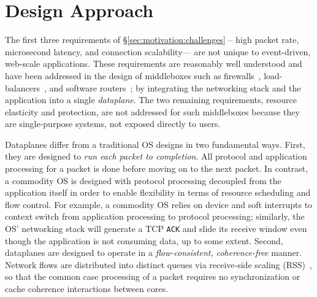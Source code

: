 \section{\ix Design Approach}
\label{sec:design}


The first three requirements of \S\ref{sec:motivation:challenges} --
high packet rate, microsecond latency, and connection scalability---
are not unique to event-driven, web-scale applications.  These
requirements are reasonably well understood and have been addressed in
the design of middleboxes such as firewalls~\cite{missing},
load-balancers~\cite{missing}, and software
routers~\cite{DBLP:journals/tocs/KohlerMCJK00,DBLP:conf/sosp/DobrescuEACFIKMR09};
by integrating the networking stack and the application into a single
\emph{dataplane}. The two remaining requirements, resource elasticity
and protection, are not addressed for such middleboxes because they
are single-purpose systems, not exposed directly to users. 


Dataplanes differ from a traditional OS designs in two fundamental
ways. First, they are designed to \emph{run each packet to
  completion}. All protocol and application processing for a packet is
done before moving on to the next packet.  In contrast, a commodity OS is designed
with protocol processing decoupled from the application itself in
order to enable flexibility in terms of resource scheduling and flow
control. For example, a commodity OS relies on device and soft interrupts to context switch from application processing to protocol processing; 
similarly, the OS' networking stack will generate a TCP \texttt{ACK} and
slide its receive window even though the application is not consuming
data, up to some extent. Second, dataplanes are designed to operate in
a \emph{flow-consistent, coherence-free} manner.
Network flows are distributed into distinct queues via receive-side
scaling (RSS)~\cite{DBLP:journals/computer/RegnierMIIMHNCF04}, so that 
the common case processing of a packet requires no synchronization or cache coherence interactions
between cores.


